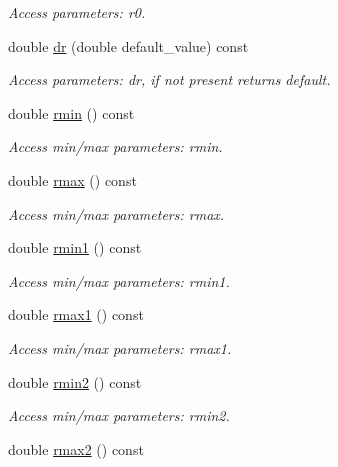 \begin{DoxyCompactItemize}
\begin{DoxyCompactList}\small\item\em Access parameters\+: r0. \end{DoxyCompactList}\item 
double \hyperlink{struct_d_d4hep_1_1_x_m_l_1_1_child_value_a19c591783fa43f70a4e4de2b3db5682a}{dr} (double default\+\_\+value) const
\begin{DoxyCompactList}\small\item\em Access parameters\+: dr, if not present returns default. \end{DoxyCompactList}\item 
double \hyperlink{struct_d_d4hep_1_1_x_m_l_1_1_child_value_a15b1bef40c8a880cce4a5e51d26249ab}{rmin} () const
\begin{DoxyCompactList}\small\item\em Access min/max parameters\+: rmin. \end{DoxyCompactList}\item 
double \hyperlink{struct_d_d4hep_1_1_x_m_l_1_1_child_value_a174432ef2e1fa18e1c92a7b5d7bdba4c}{rmax} () const
\begin{DoxyCompactList}\small\item\em Access min/max parameters\+: rmax. \end{DoxyCompactList}\item 
double \hyperlink{struct_d_d4hep_1_1_x_m_l_1_1_child_value_adae8e9c99ec8da854424895bc2cbf7ed}{rmin1} () const
\begin{DoxyCompactList}\small\item\em Access min/max parameters\+: rmin1. \end{DoxyCompactList}\item 
double \hyperlink{struct_d_d4hep_1_1_x_m_l_1_1_child_value_ad848f3ca45a170fc1637e763492ff935}{rmax1} () const
\begin{DoxyCompactList}\small\item\em Access min/max parameters\+: rmax1. \end{DoxyCompactList}\item 
double \hyperlink{struct_d_d4hep_1_1_x_m_l_1_1_child_value_a57b93bc900475dbfc6ab42b6c4cf5c89}{rmin2} () const
\begin{DoxyCompactList}\small\item\em Access min/max parameters\+: rmin2. \end{DoxyCompactList}\item 
double \hyperlink{struct_d_d4hep_1_1_x_m_l_1_1_child_value_a71cba05de320b00790714ffb32b7cd24}{rmax2} () const

\end{DoxyCompactItemize}
